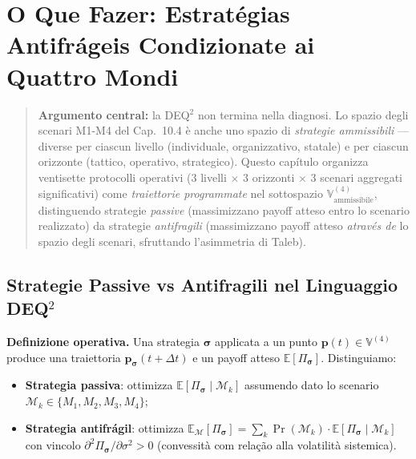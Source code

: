\chapter{O Que Fazer: Estratégias Antifrágeis Condizionate ai Quattro
Mondi}\label{cosa-fare-strategie-antifragili-condizionate-ai-quattro-mondi}

\begin{quote}
\textbf{Argumento central:} la DEQ$^2$ non termina nella diagnosi. Lo
spazio degli scenari M1-M4 del Cap.~10.4 è anche uno spazio di
\emph{strategie ammissibili} --- diverse per ciascun livello
(individuale, organizzativo, statale) e per ciascun orizzonte (tattico,
operativo, strategico). Questo capítulo organizza ventisette protocolli
operativi (3 livelli $\times$ 3 orizzonti $\times$ 3 scenari aggregati significativi)
come \emph{traiettorie programmate} nel sottospazio
\(\mathbb{V}^{(4)}_{\text{ammissibile}}\), distinguendo strategie
\emph{passive} (massimizzano payoff atteso entro lo scenario realizzato)
da strategie \emph{antifragili} (massimizzano payoff atteso
\emph{através de} lo spazio degli scenari, sfruttando l'asimmetria di
Taleb).
\end{quote}



\section{Strategie Passive vs Antifragili nel Linguaggio
DEQ$^2$}\label{strategie-passive-vs-antifragili-nel-linguaggio-dequxb2}

\Hypoth{} \textbf{Definizione operativa.} Una strategia
\(\boldsymbol{\sigma}\) applicata a un punto
\(\boldsymbol{p}(t) \in \mathbb{V}^{(4)}\) produce una traiettoria
\(\boldsymbol{p}_{\boldsymbol{\sigma}}(t+\Delta t)\) e un payoff atteso
\(\mathbb{E}[\Pi_{\boldsymbol{\sigma}}]\). Distinguiamo:

\begin{itemize}
\tightlist
\item
  \textbf{Strategia passiva}: ottimizza
  \(\mathbb{E}[\Pi_{\boldsymbol{\sigma}} \mid \mathcal{M}_k]\) assumendo
  dato lo scenario \(\mathcal{M}_k \in \{M_1, M_2, M_3, M_4\}\);
\item
  \textbf{Strategia antifrágil}: ottimizza
  \(\mathbb{E}_{\mathcal{M}}[\Pi_{\boldsymbol{\sigma}}] = \sum_k \Pr(\mathcal{M}_k) \cdot \mathbb{E}[\Pi_{\boldsymbol{\sigma}} \mid \mathcal{M}_k]\)
  con vincolo
  \(\partial^2 \Pi_{\boldsymbol{\sigma}} / \partial \sigma^2 > 0\)
  (convessità com relação alla volatilità sistemica).
\end{itemize}

